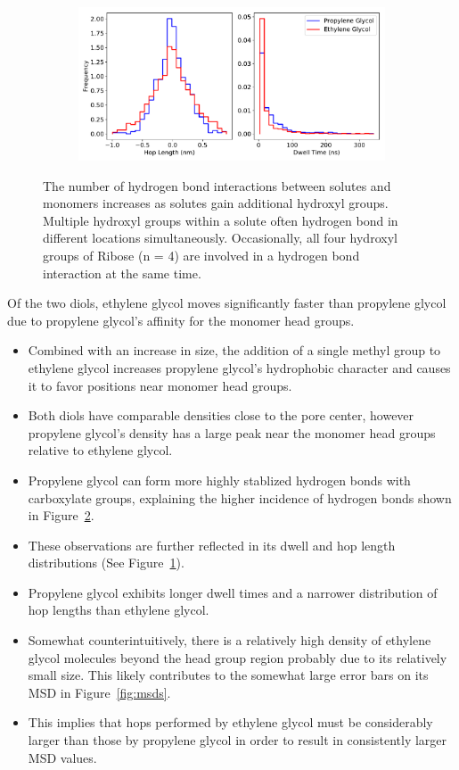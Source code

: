 \documentclass{article}
\begin{document}
\begin{figure}[!htb]
\begin{subfigure}{\textwidth}
  \includegraphics[width=0.9\linewidth]{dwell_hop_PG_GCL.pdf}
  \caption{}\label{fig:dwell_hop_PG_GCL}
  \end{subfigure}
  \caption{The number of hydrogen bond interactions between solutes and monomers increases
  as solutes gain additional hydroxyl groups. Multiple hydroxyl groups within a solute often
  hydrogen bond in different locations simultaneously. Occasionally, all four hydroxyl groups
  of Ribose (n = 4) are involved in a hydrogen bond interaction at the same time.}\label{fig:multi_hbonds}
  \end{figure}
  
  Of the two diols, ethylene glycol moves significantly faster than propylene glycol
  due to propylene glycol's affinity for the monomer head groups.  
  \begin{itemize}
    \item Combined with an increase in size, the addition of a single methyl group to ethylene glycol
    increases propylene glycol's hydrophobic character and causes it to favor positions
    near monomer head groups.
    \item Both diols have comparable densities close to the pore center, however propylene glycol's
    density has a large peak near the monomer head groups relative to ethylene glycol.
    \item Propylene glycol can form more highly stablized hydrogen bonds with carboxylate groups,
    explaining the higher incidence of hydrogen bonds shown in Figure~\ref{fig:multi_hbonds}.
    \item These observations are further reflected in its dwell and hop length distributions
    (See Figure~\ref{fig:dwell_hop_PG_GCL}).
    \item Propylene glycol exhibits longer dwell times and a narrower distribution of 
    hop lengths than ethylene glycol. 
    \item Somewhat counterintuitively, there is a relatively high density of ethylene
    glycol molecules beyond the head group region probably due to its relatively small size.
    This likely contributes to the somewhat large error bars on its MSD in Figure~\ref{fig:msds}. 
    \item This implies that hops performed by ethylene glycol must be considerably larger
    than those by propylene glycol in order to result in consistently larger MSD values.
  \end{itemize}
  
\end{document}
